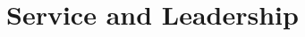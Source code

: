 \documentclass[margin,line]{res}
\begin{document}
\begin{resume}
{\begin{itemize}
\end{itemize}
}



\section{\sc Service and Leadership}


\end{resume}
\end{document}
